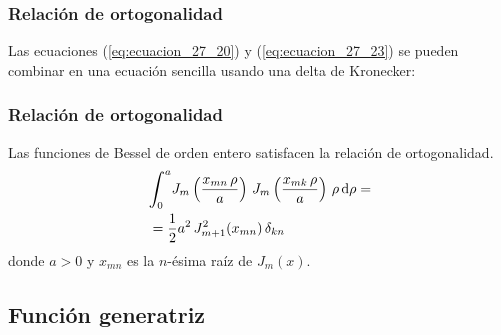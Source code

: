\documentclass[12pt]{beamer}
\begin{document}
\begin{frame}
\frametitle{Relación de ortogonalidad}
Las ecuaciones (\ref{eq:ecuacion_27_20}) y (\ref{eq:ecuacion_27_23}) se pueden combinar en una ecuación sencilla usando una delta de Kronecker:
\end{frame}
\begin{frame}
\frametitle{Relación de ortogonalidad}
\begin{tcolorbox}
Las funciones de Bessel de orden entero satisfacen la relación de ortogonalidad.
\begin{eqnarray}
\begin{aligned}
&\scaleint{6ex}_{\bs 0}^{a} J_{m} \left(\dfrac{x_{mn} \, \rho}{a} \right) \, J_{m} \left(\dfrac{x_{mk} \, \rho}{a} \right) \, \rho \dd{\rho} = \\
&= \dfrac{1}{2} a^{2} \, J_{m+1}^{2} (x_{mn}) \, \delta_{kn}
\end{aligned}
\label{eq:ecuacion_27_24}
\end{eqnarray}
donde $a > 0$ y $x_{mn}$ es la $n$-ésima raíz de $J_{m}(x)$.
\end{tcolorbox}
\end{frame}

\subsection{Función generatriz}
\end{document}

